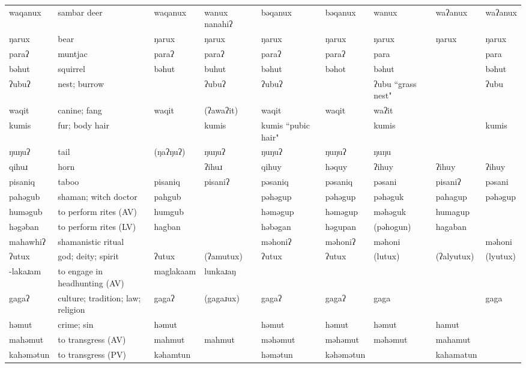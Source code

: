 \begin{landscape}
\begin{longtable}{*{9}{>{\raggedright\arraybackslash}p{}}}
\text{*}waqanux & sambar deer & waqanux & wanux nanahiʔ & bəqanux & bəqanux & wanux & waʔanux & waʔanux\\
\text{*}ŋarux & bear & ŋarux & ŋarux & ŋarux & ŋarux & ŋarux & ŋarux & ŋarux\\
\text{*}paraʔ & muntjac & paraʔ & paraʔ & paraʔ & paraʔ & para &  & para\\
\text{*}bəhut & squirrel & bəhut & buhut & bəhut & bəhot & bəhut &  & bəhut\\
\text{*}ʔubuʔ & nest; burrow &  & ʔubuʔ & ʔubuʔ &  & ʔubu \newline ``grass nest" &  & ʔubu\\
\text{*}waqit & canine; fang & waqit & (ʔawaʔit) & waqit & waqit & waʔit &  & \\
\text{*}kumis & fur; body hair &  & kumis & kumis \newline ``pubic hair" &  & kumis &  & kumis\\
\text{*}ŋuŋuʔ & tail & (ŋaʔŋuʔ) & ŋuŋuʔ & ŋuŋuʔ & ŋuŋuʔ & ŋuŋu &  & \\
\text{*}qihuɹ & horn &  & ʔihuɹ & qihuy & həquy & ʔihuy & ʔihuy & ʔihuy\\
\text{*}pisaniq & taboo & pisaniq & pisaniʔ & pəsaniq & pəsaniq & pəsani & pisaniʔ & pəsani\\
\text{*}pahəgub & shaman; witch doctor & pahgub &  & pəhəgup & pəhəgup & pəhəguk & pahagup & pəhəgup\\
\text{*}huməgub & to perform rites (AV) & humgub &  & həməgup & həməgup & məhəguk & humagup & \\
\text{*}həgəban & to perform rites (LV) & hagban &  & həbəgan & həgupan & (pəhogun) & hagaban & \\
\text{*}mahawhiʔ & shamanistic ritual &  &  & məhoniʔ & məhoniʔ & məhoni &  & məhoni\\
\text{*}ʔutux & god; deity; spirit & ʔutux & (ʔamutux) & ʔutux & ʔutux & (lutux) & (ʔalyutux) & (lyutux)\\
\text{*}-lakaɹam & to engage in headhunting (AV) & maglakaam & lunkaɹaŋ &  &  &  &  & \\
\text{*}gagaʔ & culture; tradition; law; religion & gagaʔ & (gagaɹux) & gagaʔ & gagaʔ & gaga &  & gaga\\
\text{*}həmut & crime; sin & həmut &  & həmut & həmut & həmut & hamut & \\
\text{*}mahəmut & to transgress (AV) & mahmut & mahmut & məhəmut & məhəmut & məhəmut & mahamut & \\
\text{*}kahəmətun & to transgress (PV) & kəhamtun &  & həmətun & kəhəmətun &  & kahamatun & \\

\end{longtable}
\end{landscape}
